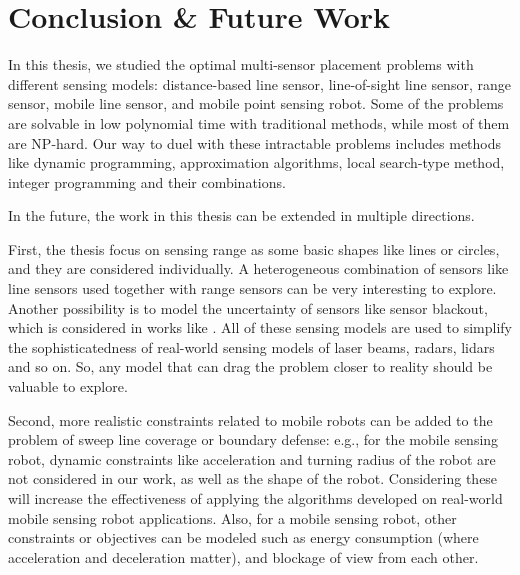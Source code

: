 
\chapter{Conclusion \& Future Work}
\thispagestyle{myheadings}
In this thesis, we studied the optimal multi-sensor placement problems with different sensing models:
distance-based line sensor, line-of-sight line sensor, range sensor, mobile line sensor, and mobile point sensing robot.
Some of the problems are solvable in low polynomial time with traditional methods, while most of them are NP-hard.
Our way to duel with these intractable problems includes methods like dynamic programming, approximation algorithms,
local search-type method, integer programming and their combinations. 

In the future, the work in this thesis can be extended in multiple directions.

First, the thesis focus on sensing range as some basic shapes like lines or circles, and they are considered individually.
A heterogeneous combination of sensors like line sensors used together with range sensors can be very interesting to explore.
Another possibility is to model the uncertainty of sensors like sensor blackout, which is considered in works like \cite{Olsen2022ICRA}.
All of these sensing models are used to simplify the sophisticatedness of real-world sensing models of laser beams, radars, lidars and so on.
So, any model that can drag the problem closer to reality should be valuable to explore.

Second, more realistic constraints related to mobile robots can be added to the problem of sweep line coverage or boundary defense: 
e.g., for the mobile sensing robot, dynamic constraints like acceleration and turning radius of the robot are not considered in our work, 
as well as the shape of the robot. 
Considering these will increase the effectiveness of applying the algorithms developed on real-world mobile sensing robot applications.
Also, for a mobile sensing robot, other constraints or objectives can be modeled such as energy consumption (where acceleration and deceleration matter), and
blockage of view from each other.

